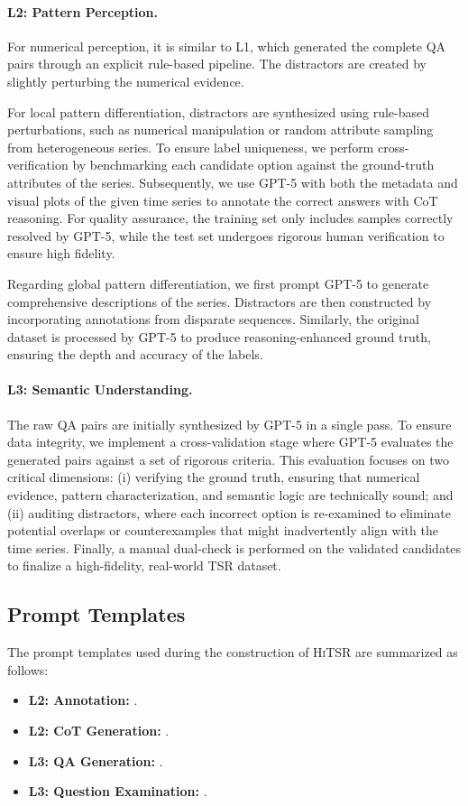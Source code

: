 \documentclass[11pt]{article}
\begin{document}
\paragraph{L2: Pattern Perception.} 
For numerical perception, it is similar to L1, which generated the complete QA pairs through an explicit rule-based pipeline. The distractors are created by slightly perturbing the numerical evidence.

For local pattern differentiation, distractors are synthesized using rule-based perturbations, such as numerical manipulation or random attribute sampling from heterogeneous series. To ensure label uniqueness, we perform cross-verification by benchmarking each candidate option against the ground-truth attributes of the series. Subsequently, we use GPT-5 with both the metadata and visual plots of the given time series to annotate the correct answers with CoT reasoning. For quality assurance, the training set only includes samples correctly resolved by GPT-5, while the test set undergoes rigorous human verification to ensure high fidelity.

Regarding global pattern differentiation, we first prompt GPT-5 to generate comprehensive descriptions of the series. Distractors are then constructed by incorporating annotations from disparate sequences. Similarly, the original dataset is processed by GPT-5 to produce reasoning-enhanced ground truth, ensuring the depth and accuracy of the labels.

\paragraph{L3: Semantic Understanding.}
The raw QA pairs are initially synthesized by GPT-5 in a single pass. To ensure data integrity, we implement a cross-validation stage where GPT-5 evaluates the generated pairs against a set of rigorous criteria. This evaluation focuses on two critical dimensions: (i) verifying the ground truth, ensuring that numerical evidence, pattern characterization, and semantic logic are technically sound; and (ii) auditing distractors, where each incorrect option is re-examined to eliminate potential overlaps or counterexamples that might inadvertently align with the time series. Finally, a manual dual-check is performed on the validated candidates to finalize a high-fidelity, real-world TSR dataset.
 
\subsection{Prompt Templates}
The prompt templates used during the construction of \textsc{HiTSR} are summarized as follows:
\begin{itemize}[left=0pt]
\setlength{\itemsep}{0.5pt}
    \item \textbf{L2: Annotation:} .
    \item \textbf{L2: CoT Generation:} .
    \item \textbf{L3: QA Generation:} .
    \item \textbf{L3: Question Examination:} .
\end{itemize}
\end{document}
